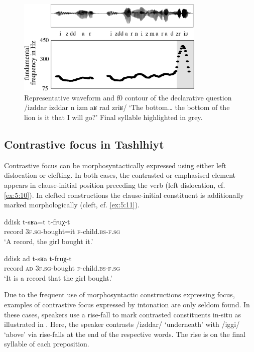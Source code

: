 \begin{figure}
  \centering 
   \includegraphics[width=0.8\textwidth]{figures/Figure_5_2_echo.png}
  \caption{Representative waveform and f0 contour of the declarative question /izddar izddar n izm aʁ rad zriʁ/ ‘The bottom… the bottom of the lion is it that I will go?’ Final syllable highlighted in grey.}
   \label{fig:5.2}
   \end{figure}

\subsection{Contrastive focus in Tashlhiyt}
Contrastive focus can be morphosyntactically expressed using either left dislocation or clefting. In both cases, the contrasted or emphasised element appears in clause-initial position preceding the verb (left dislocation, cf. \ref{ex:5:10}). In clefted constructions the clause-initial constituent is additionally marked morphologically (cleft, cf. \ref{ex:5:11}).

\ea\label{ex:5:10}
\gll  ddisk	t-sʁa=t	t-fruχ-t \\
      record \textsc{3f.sg}-bought=it \textsc{f}-child.\textsc{bs-f.sg}\\
\glt ‘A record, the girl bought it.’
\z

\ea\label{ex:5:11}
\gll  ddisk ad t-sʁa t-fruχ-t  \\
      record \textsc{ad} \textsc{3f.sg}-bought \textsc{f}-child.\textsc{bs-f.sg}\\
\glt ‘It is a record that the girl bought.’
\z

Due to the frequent use of morphosyntactic constructions expressing focus, examples of contrastive focus expressed by intonation are only seldom found. In these cases, speakers use a rise-fall to mark contrasted constituents in-situ as illustrated in . Here, the speaker contrasts /izddar/ ‘underneath’ with /iggi/ ‘above’ via rise-falls at the end of the respective words. The rise is on the final syllable of each preposition.

